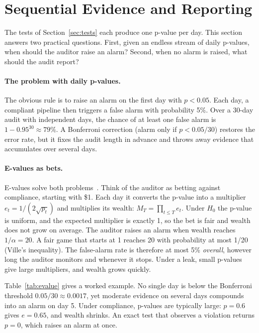 \documentclass[10pt,twocolumn,letterpaper]{article}
\theoremstyle{definition}
\begin{document}
\section{Sequential Evidence and Reporting}\label{sec:stats}
The tests of Section~\ref{sec:tests} each produce one p-value per day. This
section answers two practical questions. First, given an endless stream of
daily p-values, when should the auditor raise an alarm? Second, when no alarm
is raised, what should the audit report?

\paragraph{The problem with daily p-values.}
The obvious rule is to raise an alarm on the first day with $p<0.05$. Each day,
a compliant pipeline then triggers a false alarm with probability 5\%. Over a
30-day audit with independent days, the chance of at least one false alarm is
$1-0.95^{30}\approx 79\%$. A Bonferroni correction (alarm only if $p<0.05/30$)
restores the error rate, but it fixes the audit length in advance and throws
away evidence that accumulates over several days.

\paragraph{E-values as bets.}
E-values solve both problems~\citep{shafer2011test,vovk2021evalues,ramdas2023game}.
Think of the auditor as betting against compliance, starting with \$1. Each day
it converts the p-value into a multiplier $e_t=1/(2\sqrt{p_t})$ and multiplies
its wealth: $M_T=\prod_{t\le T}e_t$. Under $H_0$ the p-value is uniform, and the
expected multiplier is exactly 1, so the bet is fair and wealth does not grow
on average. The auditor raises an alarm when wealth reaches $1/\alpha=20$. A
fair game that starts at 1 reaches 20 with probability at most 1/20 (Ville's
inequality). The false-alarm rate is therefore at most 5\% \emph{overall},
however long the auditor monitors and whenever it stops. Under a leak, small
p-values give large multipliers, and wealth grows quickly.

Table~\ref{tab:evalue} gives a worked example. No single day is below the
Bonferroni threshold $0.05/30\approx 0.0017$, yet moderate evidence on several
days compounds into an alarm on day 5. Under compliance, p-values are
typically large: $p=0.6$ gives $e=0.65$, and wealth shrinks. An exact test that
observes a violation returns $p=0$, which raises an alarm at once.
\end{document}
